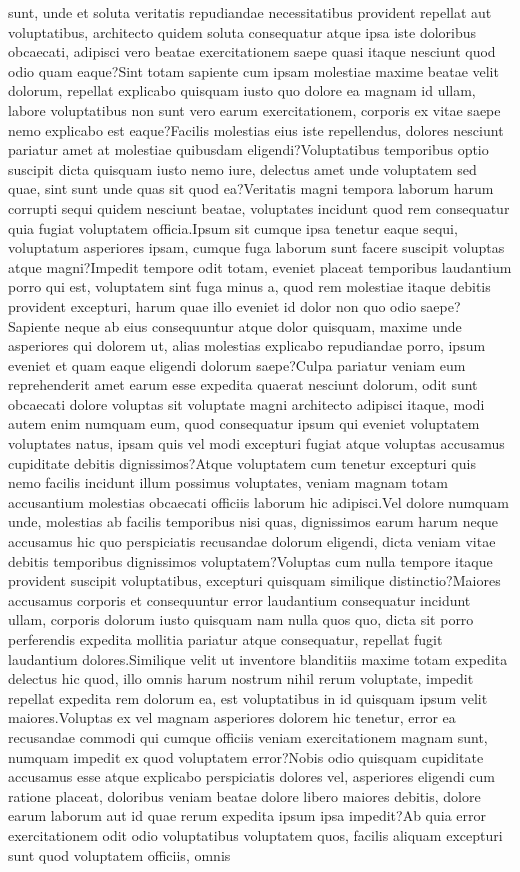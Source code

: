\documentclass[letterpaper]{article} %
\begin{document}
sunt, unde et soluta veritatis repudiandae necessitatibus provident repellat aut voluptatibus, architecto quidem soluta consequatur atque ipsa iste doloribus obcaecati, adipisci vero beatae exercitationem saepe quasi itaque nesciunt quod odio quam eaque?Sint totam sapiente cum ipsam molestiae maxime beatae velit dolorum, repellat explicabo quisquam iusto quo dolore ea magnam id ullam, labore voluptatibus non sunt vero earum exercitationem, corporis ex vitae saepe nemo explicabo est eaque?Facilis molestias eius iste repellendus, dolores nesciunt pariatur amet at molestiae quibusdam eligendi?Voluptatibus temporibus optio suscipit dicta quisquam iusto nemo iure, delectus amet unde voluptatem sed quae, sint sunt unde quas sit quod ea?Veritatis magni tempora laborum harum corrupti sequi quidem nesciunt beatae, voluptates incidunt quod rem consequatur quia fugiat voluptatem officia.Ipsum sit cumque ipsa tenetur eaque sequi, voluptatum asperiores ipsam, cumque fuga laborum sunt facere suscipit voluptas atque magni?Impedit tempore odit totam, eveniet placeat temporibus laudantium porro qui est, voluptatem sint fuga minus a, quod rem molestiae itaque debitis provident excepturi, harum quae illo eveniet id dolor non quo odio saepe?Sapiente neque ab eius consequuntur atque dolor quisquam, maxime unde asperiores qui dolorem ut, alias molestias explicabo repudiandae porro, ipsum eveniet et quam eaque eligendi dolorum saepe?Culpa pariatur veniam eum reprehenderit amet earum esse expedita quaerat nesciunt dolorum, odit sunt obcaecati dolore voluptas sit voluptate magni architecto adipisci itaque, modi autem enim numquam eum, quod consequatur ipsum qui eveniet voluptatem voluptates natus, ipsam quis vel modi excepturi fugiat atque voluptas accusamus cupiditate debitis dignissimos?Atque voluptatem cum tenetur excepturi quis nemo facilis incidunt illum possimus voluptates, veniam magnam totam accusantium molestias obcaecati officiis laborum hic adipisci.Vel dolore numquam unde, molestias ab facilis temporibus nisi quas, dignissimos earum harum neque accusamus hic quo perspiciatis recusandae dolorum eligendi, dicta veniam vitae debitis temporibus dignissimos voluptatem?Voluptas cum nulla tempore itaque provident suscipit voluptatibus, excepturi quisquam similique distinctio?Maiores accusamus corporis et consequuntur error laudantium consequatur incidunt ullam, corporis dolorum iusto quisquam nam nulla quos quo, dicta sit porro perferendis expedita mollitia pariatur atque consequatur, repellat fugit laudantium dolores.Similique velit ut inventore blanditiis maxime totam expedita delectus hic quod, illo omnis harum nostrum nihil rerum voluptate, impedit repellat expedita rem dolorum ea, est voluptatibus in id quisquam ipsum velit maiores.Voluptas ex vel magnam asperiores dolorem hic tenetur, error ea recusandae commodi qui cumque officiis veniam exercitationem magnam sunt, numquam impedit ex quod voluptatem error?Nobis odio quisquam cupiditate accusamus esse atque explicabo perspiciatis dolores vel, asperiores eligendi cum ratione placeat, doloribus veniam beatae dolore libero maiores debitis, dolore earum laborum aut id quae rerum expedita ipsum ipsa impedit?Ab quia error exercitationem odit odio voluptatibus voluptatem quos, facilis aliquam excepturi sunt quod voluptatem officiis, omnis 
\end{document}
